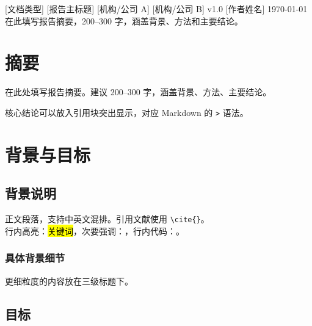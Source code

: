 

\reporttitle
  {[文档类型]}                 %
  {[报告主标题]}               %
  {[机构/公司 A]}              %
  {[机构/公司 B]}              %
  {v1.0}                       %
  {[作者姓名]}                 %
  {\today}                     %
  {在此填写报告摘要，200--300 字，涵盖背景、方法和主要结论。}

\tableofcontents
\newpage

\section{摘要}

在此处填写报告摘要。建议 200--300 字，涵盖背景、方法、主要结论。

\begin{quoteblock}
  核心结论可以放入引用块突出显示，对应 Markdown 的 \texttt{>} 语法。
\end{quoteblock}

\section{背景与目标}

\subsection{背景说明}

正文段落，支持中英文混排。引用文献使用 \texttt{\textbackslash cite\{\}}。\\
行内高亮：\hl{关键词}，次要强调：，行内代码：。

\subsubsection{具体背景细节}

更细粒度的内容放在三级标题下。

\subsection{目标}

